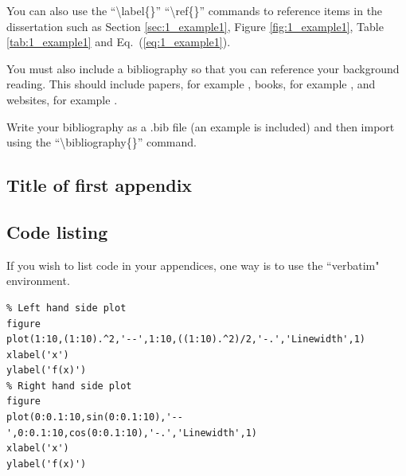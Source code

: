 \documentclass[11pt,a4paper,oneside]{book}
\begin{document}
You can also use the ``\textbackslash label\{\}'' ``\textbackslash ref\{\}'' commands to reference items in the dissertation such as Section \ref{sec:1_example1}, Figure \ref{fig:1_example1}, Table \ref{tab:1_example1} and Eq.~(\ref{eq:1_example1}).

You must also include a bibliography so that you can reference your background reading. This should include papers, for example \cite{fusai2015}, books, for example \cite{Press2007}, and websites, for example \cite{Wang2014}.

Write your bibliography as a .bib file (an example is included) and then import using the ``\textbackslash bibliography\{\}'' command.





\begin{appendices}
\chapter{Title of first appendix}
\section{Code listing}
If you wish to list code in your appendices, one way is to use the ``verbatim" environment.

\begin{verbatim}
% Left hand side plot
figure
plot(1:10,(1:10).^2,'--',1:10,((1:10).^2)/2,'-.','Linewidth',1)
xlabel('x')
ylabel('f(x)')
% Right hand side plot
figure
plot(0:0.1:10,sin(0:0.1:10),'--',0:0.1:10,cos(0:0.1:10),'-.','Linewidth',1)
xlabel('x')
ylabel('f(x)')
\end{verbatim}

\end{appendices}
\end{document}
